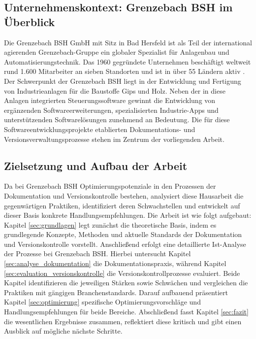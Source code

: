 \documentclass[12pt,oneside]{article}
\begin{document}
    \subsection{Unternehmenskontext: Grenzebach BSH im Überblick}
    \label{subsec:unternehmenskontext}
    Die Grenzebach BSH GmbH mit Sitz in Bad Hersfeld ist als Teil der international agierenden Grenzebach-Gruppe ein globaler Spezialist für Anlagenbau und Automatisierungstechnik. Das 1960 gegründete Unternehmen beschäftigt weltweit rund 1.600 Mitarbeiter an sieben Standorten und ist in über 55 Ländern aktiv \cite{GrenzebachWebsite}. Der Schwerpunkt der Grenzebach BSH liegt in der Entwicklung und Fertigung von Industrieanlagen für die Baustoffe Gips und Holz. Neben der in diese Anlagen integrierten Steuerungssoftware gewinnt die Entwicklung von ergänzenden Softwareerweiterungen, spezialisierten Industrie-Apps und unterstützenden Softwarelösungen zunehmend an Bedeutung. Die für diese Softwareentwicklungsprojekte etablierten Dokumentations- und Versionsverwaltungsprozesse stehen im Zentrum der vorliegenden Arbeit.

    \subsection{Zielsetzung und Aufbau der Arbeit}
    \label{subsec:zielsetzung}
    Da bei Grenzebach BSH Optimierungspotenziale in den Prozessen der Dokumentation und Versionskontrolle bestehen, analysiert diese Hausarbeit die gegenwärtigen Praktiken, identifiziert deren Schwachstellen und entwickelt auf dieser Basis konkrete Handlungsempfehlungen.
    \newline
    Die Arbeit ist wie folgt aufgebaut: Kapitel \ref{sec:grundlagen} legt zunächst die theoretische Basis, indem es grundlegende Konzepte, Methoden und aktuelle Standards der Dokumentation und Versionskontrolle vorstellt. Anschließend erfolgt eine detaillierte Ist-Analyse der Prozesse bei Grenzebach BSH. Hierbei untersucht Kapitel \ref{sec:analyse_dokumentation} die Dokumentationspraxis, während Kapitel \ref{sec:evaluation_versionskontrolle} die Versionskontrollprozesse evaluiert. Beide Kapitel identifizieren die jeweiligen Stärken sowie Schwächen und vergleichen die Praktiken mit gängigen Branchenstandards. Darauf aufbauend präsentiert Kapitel \ref{sec:optimierung} spezifische Optimierungsvorschläge und Handlungsempfehlungen für beide Bereiche. Abschließend fasst Kapitel \ref{sec:fazit} die wesentlichen Ergebnisse zusammen, reflektiert diese kritisch und gibt einen Ausblick auf mögliche nächste Schritte.
\end{document}
